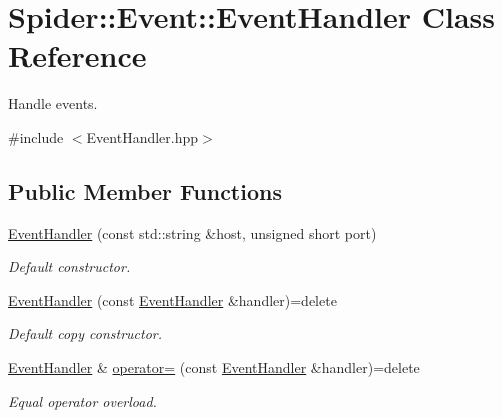 \hypertarget{class_spider_1_1_event_1_1_event_handler}{}\section{Spider\+:\+:Event\+:\+:Event\+Handler Class Reference}
\label{class_spider_1_1_event_1_1_event_handler}


Handle events.  




{\ttfamily \#include $<$Event\+Handler.\+hpp$>$}

\subsection*{Public Member Functions}
\begin{DoxyCompactItemize}
\item 
\hyperlink{class_spider_1_1_event_1_1_event_handler_a97d86b6085e4158f8389f2e31dd0c336}{Event\+Handler} (const std\+::string \&host, unsigned short port)
\begin{DoxyCompactList}\small\item\em Default constructor. \end{DoxyCompactList}\item 
\mbox{\label{class_spider_1_1_event_1_1_event_handler_a3c8af183af0a7e88983cea02883bc674}} 
\hyperlink{class_spider_1_1_event_1_1_event_handler_a3c8af183af0a7e88983cea02883bc674}{Event\+Handler} (const \hyperlink{class_spider_1_1_event_1_1_event_handler}{Event\+Handler} \&handler)=delete
\begin{DoxyCompactList}\small\item\em Default copy constructor. \end{DoxyCompactList}\item 
\mbox{\label{class_spider_1_1_event_1_1_event_handler_a1b6435063e41baebcf95e0d30962b05a}} 
\hyperlink{class_spider_1_1_event_1_1_event_handler}{Event\+Handler} \& \hyperlink{class_spider_1_1_event_1_1_event_handler_a1b6435063e41baebcf95e0d30962b05a}{operator=} (const \hyperlink{class_spider_1_1_event_1_1_event_handler}{Event\+Handler} \&handler)=delete
\begin{DoxyCompactList}\small\item\em Equal operator overload. \end{DoxyCompactList}\item 

\end{DoxyCompactItemize}
